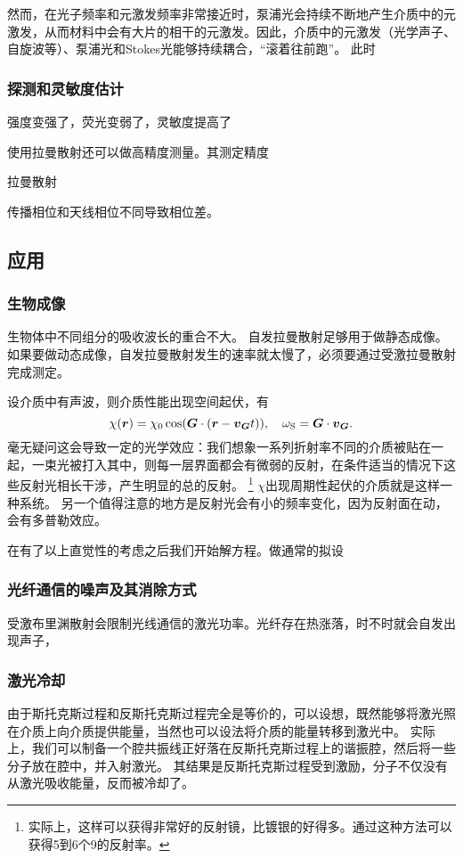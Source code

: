 然而，在光子频率和元激发频率非常接近时，泵浦光会持续不断地产生介质中的元激发，从而材料中会有大片的相干的元激发。因此，介质中的元激发（光学声子、自旋波等）、泵浦光和Stokes光能够持续耦合，“滚着往前跑”。
此时

\subsubsection{探测和灵敏度估计}

强度变强了，荧光变弱了，灵敏度提高了

使用拉曼散射还可以做高精度测量。其测定精度

拉曼散射


传播相位和天线相位不同导致相位差。

\subsection{应用}

\subsubsection{生物成像}

生物体中不同组分的吸收波长的重合不大。
自发拉曼散射足够用于做静态成像。如果要做动态成像，自发拉曼散射发生的速率就太慢了，必须要通过受激拉曼散射完成测定。

设介质中有声波，则介质性能出现空间起伏，有
\begin{equation}
    \chi(\vb*{r}) = \chi_0 \cos(\vb*{G} \cdot (\vb*{r} - \vb*{v}_{\vb*{G}} t)), \quad \omega_\text{S} = \vb*{G} \cdot \vb*{v}_{\vb*{G}}.
\end{equation}
毫无疑问这会导致一定的光学效应：我们想象一系列折射率不同的介质被贴在一起，一束光被打入其中，则每一层界面都会有微弱的反射，在条件适当的情况下这些反射光相长干涉，产生明显的总的反射。%
\footnote{
    实际上，这样可以获得非常好的反射镜，比镀银的好得多。通过这种方法可以获得5到6个9的反射率。
}%
$\chi$出现周期性起伏的介质就是这样一种系统。
另一个值得注意的地方是反射光会有小的频率变化，因为反射面在动，会有多普勒效应。

在有了以上直觉性的考虑之后我们开始解方程。做通常的拟设

\subsubsection{光纤通信的噪声及其消除方式}

受激布里渊散射会限制光线通信的激光功率。光纤存在热涨落，时不时就会自发出现声子，

\subsubsection{激光冷却}

由于斯托克斯过程和反斯托克斯过程完全是等价的，可以设想，既然能够将激光照在介质上向介质提供能量，当然也可以设法将介质的能量转移到激光中。
实际上，我们可以制备一个腔共振线正好落在反斯托克斯过程上的谐振腔，然后将一些分子放在腔中，并入射激光。
其结果是反斯托克斯过程受到激励，分子不仅没有从激光吸收能量，反而被冷却了。